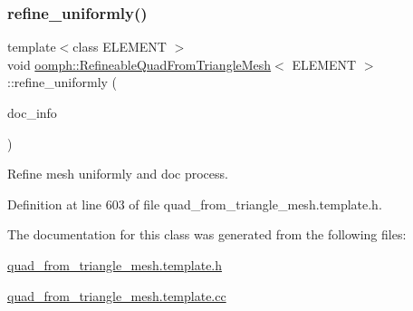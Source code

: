 \subsubsection{\texorpdfstring{refine\+\_\+uniformly()}{refine\_uniformly()}\hspace{0.1cm}{\footnotesize\ttfamily [2/2]}}
{\footnotesize\ttfamily template$<$class E\+L\+E\+M\+E\+NT $>$ \\
void \hyperlink{classoomph_1_1RefineableQuadFromTriangleMesh}{oomph\+::\+Refineable\+Quad\+From\+Triangle\+Mesh}$<$ E\+L\+E\+M\+E\+NT $>$\+::refine\+\_\+uniformly (\begin{DoxyParamCaption}\item[{Doc\+Info \&}]{doc\+\_\+info }\end{DoxyParamCaption})\hspace{0.3cm}{\ttfamily [inline]}}



Refine mesh uniformly and doc process. 



Definition at line 603 of file quad\+\_\+from\+\_\+triangle\+\_\+mesh.\+template.\+h.



The documentation for this class was generated from the following files\+:\begin{DoxyCompactItemize}
\item 
\hyperlink{quad__from__triangle__mesh_8template_8h}{quad\+\_\+from\+\_\+triangle\+\_\+mesh.\+template.\+h}\item 
\hyperlink{quad__from__triangle__mesh_8template_8cc}{quad\+\_\+from\+\_\+triangle\+\_\+mesh.\+template.\+cc}\end{DoxyCompactItemize}
